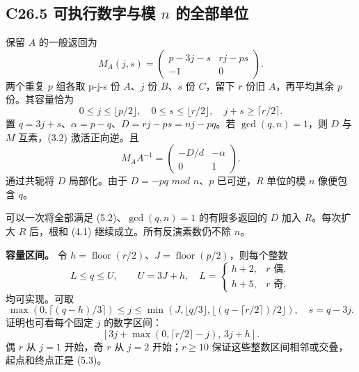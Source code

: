 \subsection*{\texorpdfstring{{C26.5} {可执行数字与模} {\ensuremath{n}} {的全部单位}}{C26.5 可执行数字与模  的全部单位}}\label{C26-h163}

{保留} {\ensuremath{A}} {的一般返回为} \[
M_A(j,s)=
\begin{pmatrix}p-3j-s&rj-ps\\-1&0\end{pmatrix}.
\tag{C26.5.1}
\] {两个重复} {\ensuremath{p}} {组各取} {p-j-s} {份} {\ensuremath{A}、\ensuremath{j}} {份} {\ensuremath{B}、\ensuremath{s}} {份} {\ensuremath{C}，留下} {\ensuremath{r}} {份旧} {\ensuremath{A}，再平均其余} {\ensuremath{p}} {份。其容量恰为} \[
0\le j\le\lfloor p/2\rfloor,\quad
0\le s\le\lfloor r/2\rfloor,\quad
j+s\ge\lceil r/2\rceil.
\tag{C26.5.2}
\] {置} {\ensuremath{q=3j+s}、\ensuremath{\alpha =p-q}、\ensuremath{D=rj-ps=nj-pq}。若} {\ensuremath{\operatorname{gcd}(q,n)=1}，则} {\ensuremath{D}} {与} {\ensuremath{M}} {互素，(3.2)} {激活正向逆。且} \[
M_AA^{-1}=\begin{pmatrix}-D/d&-\alpha\\0&1\end{pmatrix}.
\] {通过共轭将} {\ensuremath{D}} {局部化。由于} {\ensuremath{D=-pq}} {\ensuremath{mod}} {\ensuremath{n}、\ensuremath{p}} {已可逆，\ensuremath{R}} {单位的模} {\ensuremath{n}} {像便包含} {\ensuremath{q}。}

{可以一次将全部满足} {(5.2)、\ensuremath{\operatorname{gcd}(q,n)=1}} {的有限多返回的} {\ensuremath{D}} {加入} {\ensuremath{R}。每次扩大} {\ensuremath{R}} {后，根和} {(4.1)} {继续成立。所有反演素数仍不除} {\ensuremath{n}。}

\textbf{{容量区间。}} {令} {\ensuremath{h=\operatorname{floor}(r/2)}、\ensuremath{J=\operatorname{floor}(p/2)}，则每个整数} \[
L\le q\le U,\qquad
U=3J+h,\quad
L=\begin{cases}h+2,&r\text{ 偶},\\h+5,&r\text{ 奇},\end{cases}
\tag{C26.5.3}
\] {均可实现。可取} \[
\max(0,\lceil(q-h)/3\rceil)\le j\le
\min(J,\lfloor q/3\rfloor,\lfloor(q-\lceil r/2\rceil)/2\rfloor),
\quad s=q-3j.
\tag{C26.5.4}
\] {证明也可看每个固定} {\ensuremath{j}} {的数字区间：} \[
[3j+\max(0,\lceil r/2\rceil-j),\,3j+h].
\] {偶} {\ensuremath{r}} {从} {\ensuremath{j=1}} {开始，奇} {\ensuremath{r}} {从} {\ensuremath{j=2}} {开始；\ensuremath{r\ge 10}} {保证这些整数区间相邻或交叠，起点和终点正是} {(5.3)。}

